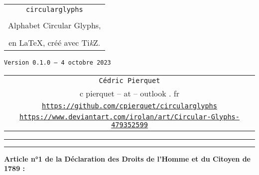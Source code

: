 \documentclass[french,11pt,a4paper]{article}
\providecommand\tikzlogo{Ti\textit{k}Z}
\let\TikZ\tikzlogo
\def\TPversion{0.1.0}
\def\TPdate{4 octobre 2023}
\begin{document}
\pagestyle{fancy}

\thispagestyle{empty}

\begin{center}
	\begin{minipage}{0.75\linewidth}
	\begin{tcolorbox}[colframe=yellow,colback=yellow!15]
		\begin{center}
			\begin{tabular}{c}
				{\Huge \texttt{circularglyphs}}\\
				\\
				{\LARGE Alphabet Circular Glyphs,} \\
				\\
				{\LARGE en \LaTeX, créé avec \TikZ.} \\
			\end{tabular}
			
			\medskip
			
			{\small \texttt{Version \TPversion{} -- \TPdate}}
		\end{center}
	\end{tcolorbox}
\end{minipage}
\end{center}

\vspace*{1mm}

\begin{center}
	\begin{tabular}{c}
	\texttt{Cédric Pierquet}\\
	{\ttfamily c pierquet -- at -- outlook . fr}\\
	\texttt{\url{https://github.com/cpierquet/circularglyphs}}
	\\
	\texttt{\url{https://www.deviantart.com/irolan/art/Circular-Glyphs-479352599}}
\end{tabular}
\end{center}

\hrule


\hypertarget{matoc}{}

\tableofcontents

\vspace*{5mm}

\hrule

\vspace*{5mm}

\vfill

\textbf{Article n°1 de la Déclaration des Droits de l'Homme et du Citoyen de 1789 : }
\end{document}
